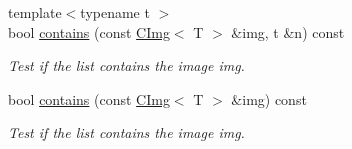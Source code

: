 \begin{DoxyCompactItemize}
{\footnotesize template$<$typename t $>$ }\\bool \hyperlink{structcimg__library__suffixed_1_1CImgList_a05e9ff94c0ef755ffa7d5485c56e2c67}{contains} (const \hyperlink{structcimg__library__suffixed_1_1CImg}{C\+Img}$<$ T $>$ \&img, t \&n) const
\begin{DoxyCompactList}\small\item\em Test if the list contains the image \textquotesingle{}img\textquotesingle{}. \end{DoxyCompactList}\item 
bool \hyperlink{structcimg__library__suffixed_1_1CImgList_a10d35aa3bc1328059922f43106c038c2}{contains} (const \hyperlink{structcimg__library__suffixed_1_1CImg}{C\+Img}$<$ T $>$ \&img) const
\begin{DoxyCompactList}\small\item\em Test if the list contains the image img. \end{DoxyCompactList}\end{DoxyCompactItemize}
